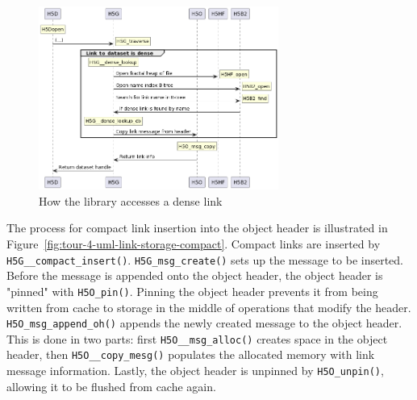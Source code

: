 \begin{figure}
\centering
\includegraphics[width=0.70\textwidth]{images/tour_4_uml_link_access_dense.png}
\caption{How the library accesses a dense link}
\label{fig:tour-4-uml-link-access-dense}
\end{figure}

The process for compact link insertion into the object header is illustrated in Figure~\ref{fig:tour-4-uml-link-storage-compact}. Compact links are inserted by \texttt{H5G\_\_compact\_insert()}. \texttt{H5G\_msg\_create()} sets up the message to be inserted. Before the message is appended onto the object header, the object header is "pinned" with \texttt{H5O\_pin()}. Pinning the object header prevents it from being written from cache to storage in the middle of operations that modify the header. \texttt{H5O\_msg\_append\_oh()} appends the newly created message to the object header. This is done in two parts: first \texttt{H5O\_\_msg\_alloc()} creates space in the object header, then \texttt{H5O\_\_copy\_mesg()} populates the allocated memory with link message information. Lastly, the object header is unpinned by \texttt{H5O\_unpin()}, allowing it to be flushed from cache again.

